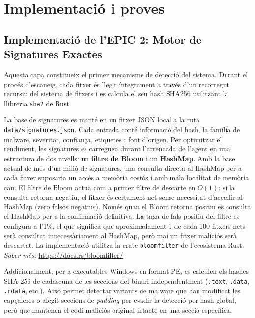 \documentclass[12pt,a4paper]{report}
\begin{document}
\chapter{Implementació i proves}
\label{ch:implementacioproves}

\section{Implementació de l'EPIC 2: Motor de Signatures Exactes}
Aquesta capa constitueix el primer mecanisme de detecció del sistema. Durant el procés d'escaneig, cada fitxer és llegit íntegrament a través d'un recorregut recursiu del sistema de fitxers i es calcula el seu hash SHA256 utilitzant la llibreria \texttt{sha2} de Rust.

La base de signatures es manté en un fitxer JSON local a la ruta \texttt{data/signatures.json}. Cada entrada conté informació del hash, la família de malware, severitat, confiança, etiquetes i font d'origen. Per optimitzar el rendiment, les signatures es carreguen durant l'arrencada de l'agent en una estructura de dos nivells: un \textbf{filtre de Bloom} i un \textbf{HashMap}. Amb la base actual de més d'un milió de signatures, una consulta directa al HashMap per a cada fitxer suposaria un accés a memòria costós i amb mala localitat de memòria cau. El filtre de Bloom actua com a primer filtre de descarte en $O(1)$: si la consulta retorna negatiu, el fitxer és certament net sense necessitat d'accedir al HashMap (zero falsos negatius). Només quan el Bloom retorna positiu es consulta el HashMap per a la confirmació definitiva. La taxa de fals positiu del filtre es configura a l'1\%, el que significa que aproximadament 1 de cada 100 fitxers nets serà consultat innecessàriament al HashMap, però mai un fitxer maliciós serà descartat. La implementació utilitza la crate \texttt{bloomfilter} de l'ecosistema Rust. \textit{Saber més:} \url{https://docs.rs/bloomfilter/}

Addicionalment, per a executables Windows en format PE, es calculen els hashes SHA-256 de cadascuna de les seccions del binari independentment (\texttt{.text}, \texttt{.data}, \texttt{.rdata}, etc.). Això permet detectar variants de malware que han modificat les capçaleres o afegit seccions de \textit{padding} per evadir la detecció per hash global, però que mantenen el codi maliciós original intacte en una secció específica.
\end{document}
